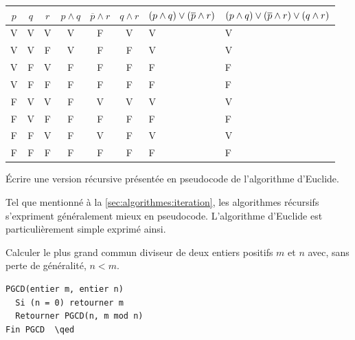 \begin{exercice}
\begin{sol}
\begin{enumerate}
\begin{tabularx}{\linewidth}{*{6}{c}>{\centering\arraybackslash}X>{\centering\arraybackslash}X}
        \toprule
        $p$ & $q$ & $r$ & $p \wedge q$ & $\overline{p} \wedge r$ & $q \wedge r$ & $(p \wedge q) \newline\vee (\overline{p} \wedge r)$ & $(p \wedge q) \newline\vee (\overline{p} \wedge r) \newline\vee (q \wedge r)$
        \\
        \midrule
        V & V & V & V & F & V & V & V \\
        V & V & F & V & F & F & V & V \\
        V & F & V & F & F & F & F & F \\
        V & F & F & F & F & F & F & F \\
        F & V & V & F & V & V & V & V \\
        F & V & F & F & F & F & F & F \\
        F & F & V & F & V & F & V & V \\
        F & F & F & F & F & F & F & F \\
        \bottomrule
      \end{tabularx}
    \end{enumerate}
  \end{sol}
\end{exercice}

\begin{exercice}
  Écrire une version récursive présentée en pseudocode de l'algorithme
  d'Euclide.
  \begin{sol}
    Tel que mentionné à la \autoref{sec:algorithmes:iteration}, les
    algorithmes récursifs s'expriment généralement mieux en pseudocode.
    L'algorithme d'Euclide est
    particulièrement simple exprimé ainsi.
    \begin{algorithme*}
      Calculer le plus grand commun diviseur de deux entiers positifs
      $m$ et $n$ avec, sans perte de généralité, $n < m$.
      \begin{pseudocode}
\begin{Verbatim}[commandchars=\\\{\}]
PGCD(entier m, entier n)
  Si (n = 0) retourner m
  Retourner PGCD(n, m mod n)
Fin PGCD  \qed
\end{Verbatim}
      \end{pseudocode}
    \end{algorithme*}
  \end{sol}
\end{exercice}

